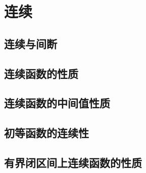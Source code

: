 

\chapter{连\emspace 续}\label{ch:3}
\section{连续与间断}
\begin{exercise}
\item
\end{exercise}
\section{连续函数的性质}
\begin{exercise}
\item
\end{exercise}
\section{连续函数的中间值性质}
\begin{exercise}
\item
\end{exercise}
\section{初等函数的连续性}
\begin{exercise}
\item
\end{exercise}
\section{有界闭区间上连续函数的性质}
\begin{exercise}
\item
\end{exercise}

\begin{exercise*}
\item
\end{exercise*}


\endinput
